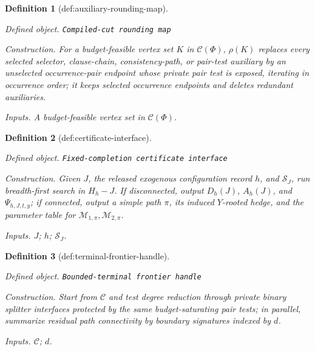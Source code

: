 \documentclass{article}
\newtheorem{definition}{Definition}
\begin{document}
\begin{definition}[def:auxiliary-rounding-map]\label{def:auxiliary-rounding-map}
\par\smallskip\noindent\emph{Defined object.} \texttt{Compiled-\allowbreak{}cut rounding map}
\par\smallskip\noindent\emph{Construction.} For a budget-feasible vertex set \(K\) in \(\mathcal C(\Phi)\), \(\rho(K)\) replaces every selected selector, clause-chain, consistency-path, or pair-test auxiliary by an unselected occurrence-pair endpoint whose private pair test is exposed, iterating in occurrence order; it keeps selected occurrence endpoints and deletes redundant auxiliaries.
\par\smallskip\noindent\emph{Inputs.} A budget-feasible vertex set in \(\mathcal C(\Phi)\).
\end{definition}

\begin{definition}[def:certificate-interface]\label{def:certificate-interface}
\par\smallskip\noindent\emph{Defined object.} \texttt{Fixed-\allowbreak{}completion certificate interface}
\par\smallskip\noindent\emph{Construction.} Given \(J\), the released exogenous configuration record \(h\), and \(\mathcal S_J\), run breadth-first search in \(H_h-J\). If disconnected, output \(D_h(J)\), \(A_h(J)\), and \(\Psi_{h,J,t,y}\); if connected, output a simple path \(\pi\), its induced \(Y\)-rooted hedge, and the parameter table for \(\mathcal M_{1,\pi},\mathcal M_{2,\pi}\).
\par\smallskip\noindent\emph{Inputs.} \(J\); \(h\); \(\mathcal S_J\).
\end{definition}

\begin{definition}[def:terminal-frontier-handle]\label{def:terminal-frontier-handle}
\par\smallskip\noindent\emph{Defined object.} \texttt{Bounded-\allowbreak{}terminal frontier handle}
\par\smallskip\noindent\emph{Construction.} Start from \(\mathcal C\) and test degree reduction through private binary splitter interfaces protected by the same budget-saturating pair tests; in parallel, summarize residual path connectivity by boundary signatures indexed by \(d\).
\par\smallskip\noindent\emph{Inputs.} \(\mathcal C\); \(d\).
\end{definition}
\end{document}
